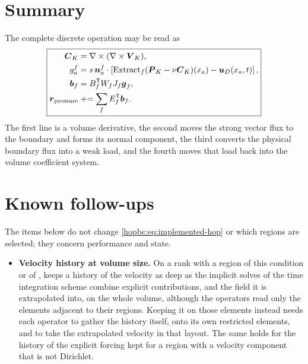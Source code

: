 \section{Summary}

The complete discrete operation may be read as
\begin{equation}
\boxed{
\begin{aligned}
\boldsymbol{C}_K
  &=\nabla\times(\nabla\times\boldsymbol{V}_K),\\
g^f_a
  &=s\,\boldsymbol{n}^f_a\cdot
    \left[\mathrm{Extract}_f(\boldsymbol{P}_K-\nu\boldsymbol{C}_K)(x_a)-\boldsymbol{u}_D(x_a,t)\right],\\
\boldsymbol{b}_f
  &=B_f^{\mathsf T}W_fJ_f\boldsymbol{g}_f,\\
\boldsymbol{r}_{\mathrm{pressure}}
  &\mathrel{+}=\sum_f E_f^{\mathsf T}\boldsymbol{b}_f.
\end{aligned}}
\end{equation}
The first line is a volume derivative, the second moves the strong vector flux
to the boundary and forms its normal component, the third converts the
physical boundary flux into a weak load, and the fourth moves that load back
into the volume coefficient system.

\section{Known follow-ups}

The items below do not change \eqref{hopbc:eq:implemented-hop} or which regions
are selected; they concern performance and state.

\begin{itemize}
  \item \textbf{Velocity history at volume size.} On a rank with a region
  of this condition or of ,  keeps
  a history of the velocity as deep as the implicit solves of the time
  integration scheme combine explicit contributions, and the field it is
  extrapolated into,
  on the whole volume, although the operators read only the elements adjacent
  to their regions. Keeping it on those elements instead needs each operator
  to gather the history itself, onto its own restricted elements, and to take
  the extrapolated velocity in that layout. The same holds for the history
  of the explicit forcing kept for a region with a velocity component that
  is not Dirichlet.
\end{itemize}

